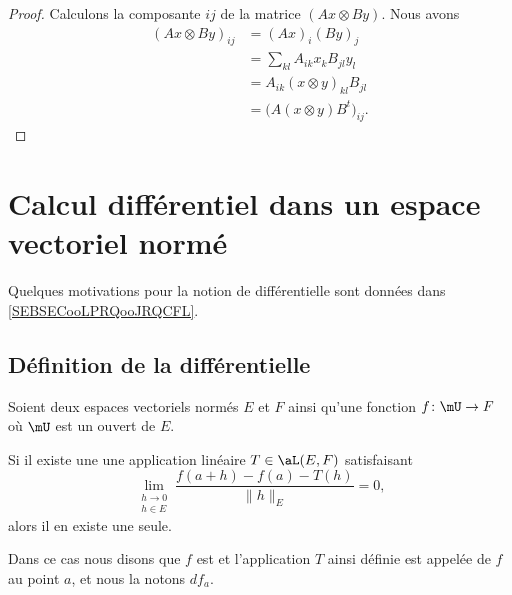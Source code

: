 \begin{proof}
    Calculons la composante \( ij\) de la matrice \( (Ax\otimes By)\). Nous avons
    \begin{subequations}
        \begin{align}
            (Ax\otimes By)_{ij}&=(Ax)_i(By)_j\\
            &=\sum_{kl}A_{ik}x_kB_{jl}y_l\\
            &=A_{ik}(x\otimes y)_{kl}B_{jl}\\
            &=\big( A(x\otimes y)B^t \big)_{ij}.
        \end{align}
    \end{subequations}
\end{proof}

\section{Calcul différentiel dans un espace vectoriel normé}
\label{SecLStKEmc}

Quelques motivations pour la notion de différentielle sont données dans \ref{SEBSECooLPRQooJRQCFL}.

\subsection{Définition de la différentielle}

\begin{propositionDef}      \label{DefDifferentiellePta}
    Soient deux espaces vectoriels normés \( E\) et \( F\) ainsi qu'une fonction \( f\colon \mU\to F\) où \( \mU\) est un ouvert de \( E\).

  Si il existe une une application linéaire \( T\in\aL(E,F)\) satisfaisant
  \begin{equation}	\label{EqCritereDefDiff}
      \lim_{\substack{h\to 0\\h\in E}}\frac{f(a+h)-f(a)-T(h)}{\|h\|_E}=0,
  \end{equation}
  alors il en existe une seule.

  Dans ce cas nous disons que $f$ est  et l'application $T$ ainsi définie est appelée  de $f$ au point $a$, et nous la notons $df_a$.
\end{propositionDef}

